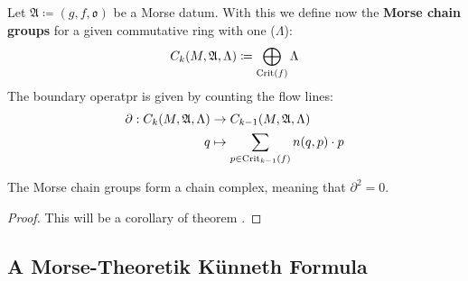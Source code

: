 \begin{definition}\label{def: Morse homology}
	Let  $\mathfrak{A}\coloneq (g,f,\mathfrak{o})$ be a Morse datum. With this we define now the \textbf{Morse chain groups} for a given commutative ring with one ($\Lambda$): 
	\begin{equation*}
		C_k(M,\mathfrak{A},\Lambda)\coloneq \bigoplus_{\mathrm{Crit}(f)}\Lambda
	\end{equation*} 
	The boundary operatpr is given by counting the flow lines: 
	\begin{align*}
		\partial: C_k(M,\mathfrak{A},\Lambda) &\to C_{k-1}(M,\mathfrak{A},\Lambda)\\
								 			q &\mapsto \sum_{p\in \mathrm{Crit}_{k-1}(f)} n(q,p)\cdot p
	\end{align*}
\end{definition}
\begin{theorem}
	The Morse chain groups form a chain complex, meaning that $\partial^2=0$.
\end{theorem}
\begin{proof}
	This will be a corollary of theorem .
\end{proof}

 \subsection{A Morse-Theoretik Künneth Formula}


